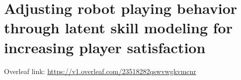 \chapter{Adjusting robot playing behavior through latent skill modeling for increasing player satisfaction}\label{ch:adaptation}

Overleaf link: \url{https://v1.overleaf.com/23518282qswvwgkvmcnr}